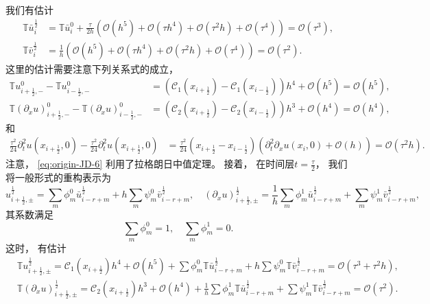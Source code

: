 我们有估计
\begin{align}
  \label{eq:origin-JD-5}
  {\mathbb{T}} \bar u_{i}^{\frac 12} & = {\mathbb{T}} \bar u_{i}^{0} + \frac{\tau}{2h} \left(\mathcal{O}(h^5)+\mathcal{O}(\tau h^4)+\mathcal{O}(\tau^2 h)+\mathcal{O}(\tau^4)\right) = {\mathcal{O}}(\tau^3), \\
  \label{eq:origin-JD-5-2}
  {\mathbb{T}} \bar v_{i}^{\frac 12} & = \frac{1}{h}\left({\mathcal{O}}(h^5) + {\mathcal{O}}(\tau h^4) + {\mathcal{O}}(\tau^2 h) + {\mathcal{O}}(\tau^4)\right) = {\mathcal{O}}(\tau^2).
\end{align}
这里的估计需要注意下列关系式的成立，
\begin{align}
  {\mathbb{T}} u_{i+\frac{1}{2},-}^{0} - {\mathbb{T}} u_{i-\frac{1}{2},-}^{0}
   & = \left(\mathcal{C}_1(x_{i+\frac{1}{2}})-\mathcal{C}_1(x_{i-\frac{1}{2}})\right)h^4+{\mathcal{O}}(h^{5})={\mathcal{O}}(h^{5}),  \\
  {\mathbb{T}}\left({\partial_x}u\right)_{i+\frac12,-}^0-{\mathbb{T}}\left({\partial_x}u\right)_{i-\frac12,-}^0
   & = \left(\mathcal{C}_2(x_{i+\frac{1}{2}})-\mathcal{C}_2(x_{i-\frac{1}{2}})\right)h^3+{\mathcal{O}}(h^{4})={\mathcal{O}}(h^{4}),
\end{align}
和
\begin{align}
  \label{eq:origin-JD-6}
  \frac{\tau^2}{24} {\partial_{t}^2} u(x_{i+\frac 12},0) - \frac{\tau^2}{24} {\partial_{t}^2} u(x_{i+\frac 12},0)
   & = \frac{\tau^2}{24} \left(x_{i+\frac 12}-x_{i-\frac 12}\right) \left({\partial_{t}^2\partial_{x}} u(x_i,0) + \mathcal{O}(h)\right) = \mathcal{O}(\tau^2 h).
\end{align}
注意，
\cref{eq:origin-JD-6} 利用了拉格朗日中值定理。
接着，
在时间层$t=\frac \tau 2$，
我们将一般形式的重构表示为
\begin{equation}
  \label{eq:origin-JD-7}
  u_{i+\frac12,\pm}^{\frac 12} = \sum_m \phi_m^0 \bar u_{i-r+m}^{\frac 12} + h \sum_m \psi_m^0 \bar v_{i-r+m}^{\frac 12}, \quad
  \left({\partial_x}u\right)_{i+\frac12,\pm}^{\frac 12} = \frac{1}{h} \sum_m \phi_m^1 \bar u_{i-r+m}^{\frac 12} + \sum_m \psi_m^1 \bar v_{i-r+m}^{\frac 12},
\end{equation}
其系数满足
\begin{equation}
  \sum_m \phi_m^0 = 1, \quad \sum_m \phi_m^1 = 0.
\end{equation}
这时，
有估计
\begin{align}
  \label{eq:origin-JD-8}
   & {\mathbb{T}}u_{i+\frac12,\pm}^{\frac 12} = \mathcal{C}_1(x_{i+\frac{1}{2}})h^4+{\mathcal{O}}(h^{5}) + \sum \phi_m^0 {\mathbb{T}} \bar u_{i-r+m}^{\frac 12} + h \sum \psi_m^0 {\mathbb{T}} \bar v_{i-r+m}^{\frac 12} = {\mathcal{O}}(\tau^3+\tau^2 h),                            \\
  \label{eq:origin-JD-8-2}
   & {\mathbb{T}}\left({\partial_x}u\right)_{i+\frac12,\pm}^{\frac 12} = \mathcal{C}_2(x_{i+\frac{1}{2}})h^3+{\mathcal{O}}(h^{4}) + \frac{1}{h} \sum \phi_m^1 {\mathbb{T}} \bar u_{i-r+m}^{\frac 12} + \sum \psi_m^1 {\mathbb{T}} \bar v_{i-r+m}^{\frac 12} = {\mathcal{O}}(\tau^2).
\end{align}
